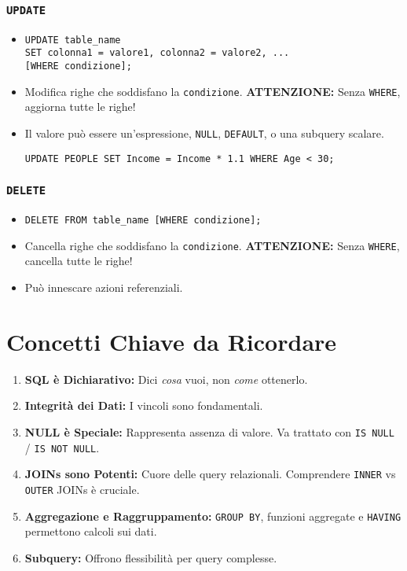 	\subsubsection{\texttt{UPDATE}}
	\begin{itemize}
		\item
		\begin{verbatim}
UPDATE table_name
SET colonna1 = valore1, colonna2 = valore2, ...
[WHERE condizione];
		\end{verbatim}
		\item Modifica righe che soddisfano la \texttt{condizione}. \textbf{ATTENZIONE:} Senza \texttt{WHERE}, aggiorna tutte le righe!
		\item Il valore può essere un'espressione, \texttt{NULL}, \texttt{DEFAULT}, o una subquery scalare.
		\begin{verbatim}
UPDATE PEOPLE SET Income = Income * 1.1 WHERE Age < 30;
		\end{verbatim}
	\end{itemize}
	
	\subsubsection{\texttt{DELETE}}
	\begin{itemize}
		\item
		\begin{verbatim}
DELETE FROM table_name [WHERE condizione];
		\end{verbatim}
		\item Cancella righe che soddisfano la \texttt{condizione}. \textbf{ATTENZIONE:} Senza \texttt{WHERE}, cancella tutte le righe!
		\item Può innescare azioni referenziali.
	\end{itemize}
	
	\section{Concetti Chiave da Ricordare}
	\begin{enumerate}
		\item \textbf{SQL è Dichiarativo:} Dici \textit{cosa} vuoi, non \textit{come} ottenerlo.
		\item \textbf{Integrità dei Dati:} I vincoli sono fondamentali.
		\item \textbf{NULL è Speciale:} Rappresenta assenza di valore. Va trattato con \texttt{IS NULL} / \texttt{IS NOT NULL}.
		\item \textbf{JOINs sono Potenti:} Cuore delle query relazionali. Comprendere \texttt{INNER} vs \texttt{OUTER} JOINs è cruciale.
		\item \textbf{Aggregazione e Raggruppamento:} \texttt{GROUP BY}, funzioni aggregate e \texttt{HAVING} permettono calcoli sui dati.
		\item \textbf{Subquery:} Offrono flessibilità per query complesse.
	\end{enumerate}
	

